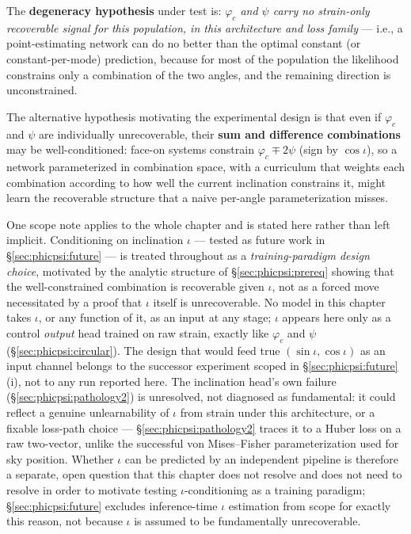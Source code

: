 The \textbf{degeneracy hypothesis} under test is: \emph{$\varphi_c$ and $\psi$ carry no strain-only recoverable signal for this population, in this architecture and loss family} --- i.e., a point-estimating network can do no better than the optimal constant (or constant-per-mode) prediction, because for most of the population the likelihood constrains only a combination of the two angles, and the remaining direction is unconstrained.

The alternative hypothesis motivating the experimental design is that even if $\varphi_c$ and $\psi$ are individually unrecoverable, their \textbf{sum and difference combinations} may be well-conditioned: face-on systems constrain $\varphi_c \mp 2\psi$ (sign by $\cos\iota$), so a network parameterized in combination space, with a curriculum that weights each combination according to how well the current inclination constrains it, might learn the recoverable structure that a naive per-angle parameterization misses.

One scope note applies to the whole chapter and is stated here rather than left implicit.
Conditioning on inclination $\iota$ --- tested as future work in \S\ref{sec:phicpsi:future} --- is treated throughout as a \emph{training-paradigm design choice}, motivated by the analytic structure of \S\ref{sec:phicpsi:prereq} showing that the well-constrained combination is recoverable given $\iota$, not as a forced move necessitated by a proof that $\iota$ itself is unrecoverable.
No model in this chapter takes $\iota$, or any function of it, as an input at any stage; $\iota$ appears here only as a control \emph{output} head trained on raw strain, exactly like $\varphi_c$ and $\psi$ (\S\ref{sec:phicpsi:circular}).
The design that would feed true $(\sin\iota, \cos\iota)$ as an input channel belongs to the successor experiment scoped in \S\ref{sec:phicpsi:future}(i), not to any run reported here.
The inclination head's own failure (\S\ref{sec:phicpsi:pathology2}) is unresolved, not diagnosed as fundamental: it could reflect a genuine unlearnability of $\iota$ from strain under this architecture, or a fixable loss-path choice --- \S\ref{sec:phicpsi:pathology2} traces it to a Huber loss on a raw two-vector, unlike the successful von Mises--Fisher parameterization used for sky position.
Whether $\iota$ can be predicted by an independent pipeline is therefore a separate, open question that this chapter does not resolve and does not need to resolve in order to motivate testing $\iota$-conditioning as a training paradigm; \S\ref{sec:phicpsi:future} excludes inference-time $\iota$ estimation from scope for exactly this reason, not because $\iota$ is assumed to be fundamentally unrecoverable.

